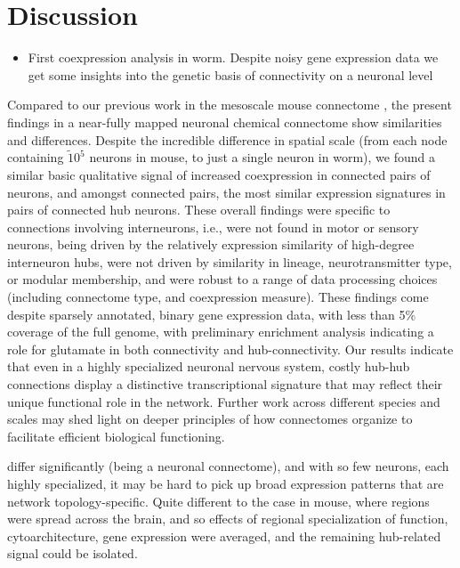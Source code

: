 \documentclass[10pt,letterpaper]{article}
\begin{document}
\section*{Discussion}
\begin{itemize}
    \item{First coexpression analysis in worm. Despite noisy gene expression data we get some insights into the genetic basis of connectivity on a neuronal level}
\end{itemize}

Compared to our previous work in the mesoscale mouse connectome \cite{Fulcher:2016ck}, the present findings in a near-fully mapped neuronal chemical connectome show similarities and differences.
Despite the incredible difference in spatial scale (from each node containing $\tilde 10^5$ neurons in mouse, to just a single neuron in worm), we found a similar basic qualitative signal of increased coexpression in connected pairs of neurons, and amongst connected pairs, the most similar expression signatures in pairs of connected hub neurons.
These overall findings were specific to connections involving interneurons, i.e., were not found in motor or sensory neurons, being driven by the relatively expression similarity of high-degree interneuron hubs, were not driven by similarity in lineage, neurotransmitter type, or modular membership, and were robust to a range of data processing choices (including connectome type, and coexpression measure).
These findings come despite sparsely annotated, binary gene expression data, with less than 5\% coverage of the full genome, with preliminary enrichment analysis indicating a role for glutamate in both connectivity and hub-connectivity.
Our results indicate that even in a highly specialized neuronal nervous system, costly hub-hub connections display a distinctive transcriptional signature that may reflect their unique functional role in the network.
Further work across different species and scales may shed light on deeper principles of how connectomes organize to facilitate efficient biological functioning.


differ significantly (being a neuronal connectome), and with so few neurons, each highly specialized, it may be hard to pick up broad expression patterns that are network topology-specific.
Quite different to the case in mouse, where regions were spread across the brain, and so effects of regional specialization of function, cytoarchitecture, gene expression were averaged, and the remaining hub-related signal could be isolated.
\end{document}
